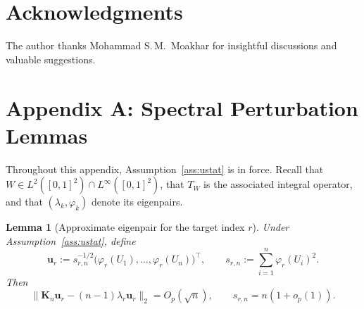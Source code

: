 \documentclass[11pt]{article}
\theoremstyle{plain}
\newtheorem{lemma}[theorem]{Lemma}
\theoremstyle{remark}
\begin{document}
\section*{Acknowledgments}
The author thanks Mohammad S.\,M.\ Moakhar for insightful discussions and valuable suggestions.



\appendix


\section*{Appendix A: Spectral Perturbation Lemmas}
\renewcommand{\thesection}{A.\arabic{section}}
\renewcommand{\thelemma}{A.\arabic{lemma}}

Throughout this appendix, Assumption~\ref{ass:ustat} is in force. Recall that
$W\in L^2([0,1]^2)\cap L^\infty([0,1]^2)$, that $T_W$ is the associated integral
operator, and that $(\lambda_k,\varphi_k)$ denote its eigenpairs.

\begin{lemma}[Approximate eigenpair for the target index $r$]
\label{lem:approx_eigvec}
Under Assumption~\ref{ass:ustat}, define
\[
\mathbf{u}_r := s_{r,n}^{-1/2}\bigl(\varphi_r(U_1),\dots,\varphi_r(U_n)\bigr)^\top,
\qquad
s_{r,n} := \sum_{i=1}^n \varphi_r(U_i)^2 .
\]
Then
\[
\|\mathbf{K}_n \mathbf{u}_r - (n-1)\lambda_r \mathbf{u}_r\|_{2} = O_p(\sqrt{n}),
\qquad
s_{r,n} = n(1 + o_p(1)).
\]
\end{lemma}
\end{document}
